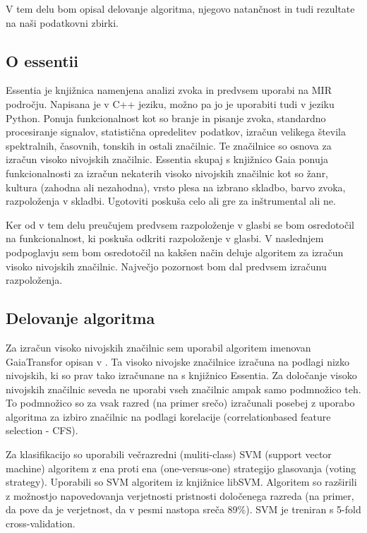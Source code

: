 \documentclass[a4paper, 12pt]{book}
\begin{document}
{V tem delu bom opisal delovanje algoritma, njegovo natančnost in tudi rezultate na naši podatkovni zbirki. 

\subsection{O essentii}

Essentia je knjižnica namenjena analizi zvoka in predvsem uporabi na MIR področju. Napisana je v C++ jeziku, možno pa jo je uporabiti tudi v jeziku Python. Ponuja funkcionalnost kot so branje in pisanje zvoka, standardno procesiranje signalov, statistična opredelitev podatkov, izračun velikega števila spektralnih, časovnih, tonskih in ostali značilnic. Te značilnice so osnova za izračun visoko nivojskih značilnic. Essentia skupaj s knjižnico Gaia ponuja funkcionalnosti za izračun nekaterih visoko nivojskih značilnic kot so žanr, kultura (zahodna ali nezahodna), vrsto plesa na izbrano skladbo, barvo zvoka, razpoloženja v skladbi. Ugotoviti poskuša celo ali gre za inštrumental ali ne. 

Ker od v tem delu preučujem predvsem razpoloženje v glasbi se bom osredotočil na funkcionalnost, ki poskuša odkriti razpoloženje v glasbi. V naslednjem podpoglavju sem bom osredotočil na kakšen način deluje algoritem za izračun visoko nivojskih značilnic. Največjo pozornost bom dal predvsem izračunu razpoloženja. 

\subsection{Delovanje algoritma}

Za izračun visoko nivojskih značilnic sem uporabil algoritem imenovan GaiaTransfor opisan v \cite{bogdanov2013form}. Ta visoko nivojske značilnice izračuna na podlagi nizko nivojskih, ki so prav tako izračunane na s knjižnico Essentia. Za določanje visoko nivojskih značilnic seveda ne uporabi vseh značilnic ampak samo podmnožico teh. To podmnožico so za vsak razred (na primer srečo) izračunali posebej z uporabo algoritma za izbiro značilnic na podlagi korelacije (correlationbased feature selection - CFS). 

Za klasifikacijo so uporabili večrazredni (muliti-class) SVM (support vector machine) algoritem z ena proti ena (one-versus-one) strategijo glasovanja (voting strategy). Uporabili so SVM algoritem iz knjižnice libSVM. Algoritem so razširili z možnostjo napovedovanja verjetnosti pristnosti določenega razreda (na primer, da pove da je verjetnost, da v pesmi nastopa sreča 89\%). SVM je treniran s 5-fold cross-validation.  

}
\end{document}
